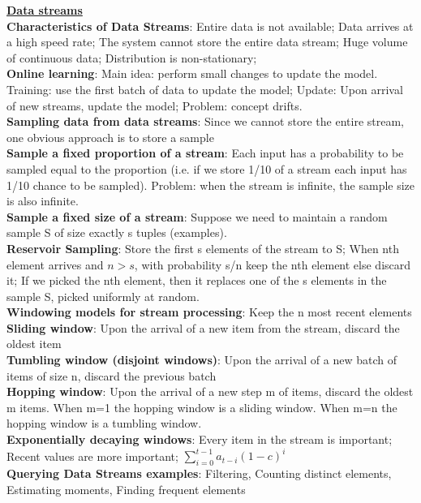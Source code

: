\documentclass[a4paper,7pt,landscape]{extarticle}
\begin{document}
\begin{multicols}{3}
\begin{boxA}
\underline{\textbf{Data streams}}\\
\textbf{Characteristics of Data Streams}: Entire data is not available; Data arrives at a high speed rate; The system cannot store the entire data stream; Huge volume of continuous data; Distribution is non-stationary;\\
\textbf{Online learning}: Main idea: perform small changes to update the model. Training: use the first batch of data to update the model; Update: Upon arrival of new streams, update the model; Problem: concept drifts.\\
\textbf{Sampling data from data streams}: Since we cannot store the entire stream, one obvious approach is to store a sample\\
\textbf{Sample a fixed proportion of a stream}: Each input has a probability to be sampled equal to the proportion (i.e. if we store 1/10 of a stream each input has 1/10 chance to be sampled). Problem: when the stream is infinite, the sample size is also infinite.\\
\textbf{Sample a fixed size of a stream}: Suppose we need to maintain a random sample S of size exactly s tuples (examples).\\
\textbf{Reservoir Sampling}: Store the first s elements of the stream to S; When nth element arrives and $n > s$, with probability s/n keep the nth element else discard it; If we picked the nth element, then it replaces one of the s elements in the sample S, picked uniformly at random.\\
\textbf{Windowing models for stream processing}: Keep the n most recent elements\\
\textbf{Sliding window}: Upon the arrival of a new item from the stream, discard the oldest item\\
\textbf{Tumbling window (disjoint windows)}: Upon the arrival of a new batch of items of size n, discard the previous batch\\
\textbf{Hopping window}: Upon the arrival of a new step  m of items, discard the oldest m items. When m=1 the hopping window is a sliding window. When m=n the hopping window is a tumbling window.\\
\textbf{Exponentially decaying windows}: Every item in the stream is important; Recent values are more important; $\sum_{i=0}^{t-1} a_{t-i} (1-c)^i$\\
\textbf{Querying Data Streams examples}: Filtering, Counting distinct elements, Estimating moments, Finding frequent elements\\

\end{boxA}
\end{multicols}
\end{document}
